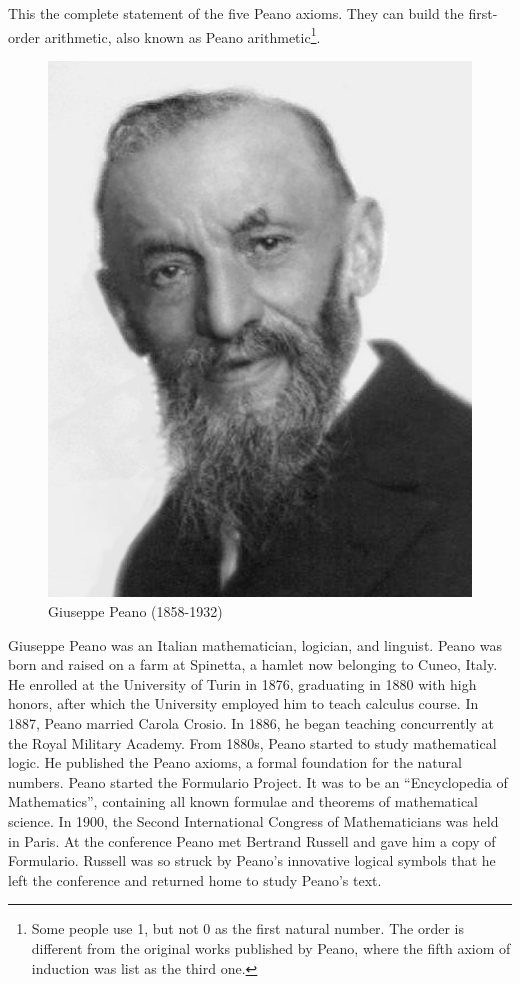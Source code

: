 \documentclass[UTF8]{article}
\begin{document}
This the complete statement of the five Peano axioms. They can build the first-order arithmetic, also known as Peano arithmetic\footnote{Some people use 1, but not 0 as the first natural number. The order is different from the original works published by Peano, where the fifth axiom of induction was list as the third one.}.

\begin{figure}[htbp]
 \centering
 \includegraphics[scale=0.2]{img/Peano.jpg}
 \caption{Giuseppe Peano (1858-1932)}
 \label{fig:Peano}
\end{figure}

Giuseppe Peano was an Italian mathematician, logician, and linguist. Peano was born and raised on a farm at Spinetta, a hamlet now belonging to Cuneo, Italy. He enrolled at the University of Turin in 1876, graduating in 1880 with high honors, after which the University employed him to teach calculus course. In 1887, Peano married Carola Crosio. In 1886, he began teaching concurrently at the Royal Military Academy. From 1880s, Peano started to study mathematical logic. He published the Peano axioms, a formal foundation for the natural numbers. Peano started the Formulario Project. It was to be an ``Encyclopedia of Mathematics'', containing all known formulae and theorems of mathematical science. In 1900, the Second International Congress of Mathematicians was held in Paris. At the conference Peano met Bertrand Russell and gave him a copy of Formulario. Russell was so struck by Peano's innovative logical symbols that he left the conference and returned home to study Peano's text\cite{M-Kline-2007}.
\end{document}
